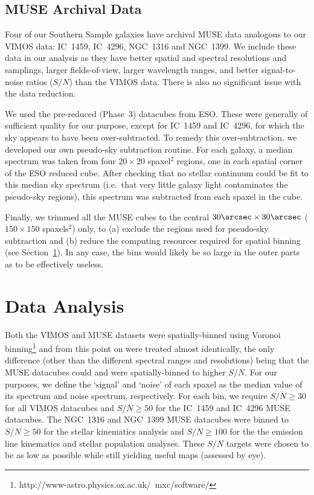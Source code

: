 \documentclass[a4paper,fleqn,usenatbib]{mnras}
\begin{document}
\subsection{MUSE Archival Data}
\label{subsec:MUSE}

Four of our Southern Sample galaxies have archival MUSE data analogous
to our VIMOS data: IC~1459, IC~4296, NGC~1316 and NGC~1399. We include
these data in our analysis as they have better spatial and spectral
resolutions and samplings, larger fields-of-view, larger wavelength
ranges, and better signal-to-noise ratios ($S/N$) than the VIMOS
data. There is also no significant issue with the data reduction.

We used the pre-reduced (Phase~3) datacubes from ESO. These were
generally of sufficient quality for our purpose, except for IC~1459
and IC~4296, for which the sky appears to have been
over-subtracted. To remedy this over-subtraction, we developed our own
pseudo-sky subtraction routine. For each galaxy, a median spectrum was
taken from four $20\times20$ spaxel$^2$ regions, one in each spatial
corner of the ESO reduced cube. After checking that no stellar
continuum could be fit to this median sky spectrum (i.e.\ that very
little galaxy light contaminates the pseudo-sky regions), this
spectrum was subtracted from each spaxel in the cube.

Finally, we trimmed all the MUSE cubes to the central
$30\arcsec\times30\arcsec$ ($150\times150$ spaxels$^2$) only, to (a)
exclude the regions used for pseudo-sky subtraction and (b) reduce the
computing resources required for spatial binning (see
Section~\ref{sec:analysis}). In any case, the bins would likely be so
large in the outer parts as to be effectively useless.

\section{Data Analysis}
\label{sec:analysis}

Both the VIMOS and MUSE datasets were spatially-binned using Voronoi
binning\footnote{http://www-astro.physics.ox.ac.uk/~mxc/software/}
\citep{Cappellari2003} and from this point on were treated almost
identically, the only difference (other than the different spectral
ranges and resolutions) being that the MUSE datacubes could and were
spatially-binned to higher $S/N$. For our purposes, we define the
`signal' and `noise' of each spaxel as the median value of its
spectrum and noise spectrum, respectively. For each bin, we require
$S/N\ge30$ for all VIMOS datacubes and $S/N\ge50$ for the IC~1459 and
IC~4296 MUSE datacubes. The NGC~1316 and NGC~1399 MUSE datacubes were
binned to $S/N\ge50$ for the stellar kinematics analysis and
$S/N\ge100$ for the the emission line kinematics and stellar
population analyses. These $S/N$ targets were chosen to be as low as
possible while still yielding useful maps (assessed by eye).
\end{document}
